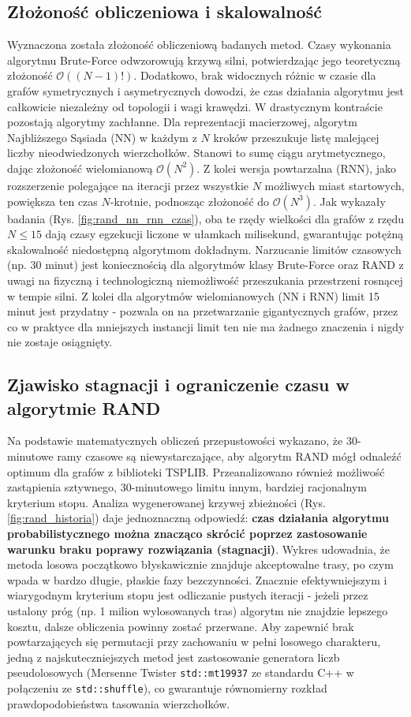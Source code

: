 \documentclass[conference]{IEEEtran}
\begin{document}
        \subsection{Złożoność obliczeniowa i skalowalność}
            Wyznaczona została złożoność obliczeniową badanych metod. Czasy wykonania algorytmu Brute-Force odwzorowują krzywą silni, potwierdzając jego teoretyczną złożoność $\mathcal{O}((N-1)!)$. Dodatkowo, brak widocznych różnic w czasie dla grafów symetrycznych i asymetrycznych dowodzi, że czas działania algorytmu jest całkowicie niezależny od topologii i wagi krawędzi.
            W drastycznym kontraście pozostają algorytmy zachłanne. Dla reprezentacji macierzowej, algorytm Najbliższego Sąsiada (NN) w każdym z $N$ kroków przeszukuje listę malejącej liczby nieodwiedzonych wierzchołków. Stanowi to sumę ciągu arytmetycznego, dając złożoność wielomianową $\mathcal{O}(N^2)$. Z kolei wersja powtarzalna (RNN), jako rozszerzenie polegające na iteracji przez wszystkie $N$ możliwych miast startowych, powiększa ten czas $N$-krotnie, podnosząc złożoność do $\mathcal{O}(N^3)$. Jak wykazały badania (Rys. \ref{fig:rand_nn_rnn_czas}), oba te rzędy wielkości dla grafów z rzędu $N \le 15$ dają czasy egzekucji liczone w ułamkach milisekund, gwarantując potężną skalowalność niedostępną algorytmom dokładnym.
            Narzucanie limitów czasowych (np. 30 minut) jest koniecznością dla algorytmów klasy Brute-Force oraz RAND z uwagi na fizyczną i technologiczną niemożliwość przeszukania przestrzeni rosnącej w tempie silni. Z kolei dla algorytmów wielomianowych (NN i RNN) limit 15 minut jest przydatny - pozwala on na przetwarzanie gigantycznych grafów, przez co w praktyce dla mniejszych instancji limit ten nie ma żadnego znaczenia i nigdy nie zostaje osiągnięty.
        \subsection{Zjawisko stagnacji i ograniczenie czasu w algorytmie RAND}
            Na podstawie matematycznych obliczeń przepustowości wykazano, że 30-minutowe ramy czasowe są niewystarczające, aby algorytm RAND mógł odnaleźć optimum dla grafów z biblioteki TSPLIB.
            Przeanalizowano również możliwość zastąpienia sztywnego, 30-minutowego limitu innym, bardziej racjonalnym kryterium stopu. Analiza wygenerowanej krzywej zbieżności (Rys. \ref{fig:rand_historia}) daje jednoznaczną odpowiedź: \textbf{czas działania algorytmu probabilistycznego można znacząco skrócić poprzez zastosowanie warunku braku poprawy rozwiązania (stagnacji)}.
            Wykres udowadnia, że metoda losowa początkowo błyskawicznie znajduje akceptowalne trasy, po czym wpada w bardzo długie, płaskie fazy bezczynności. Znacznie efektywniejszym i wiarygodnym kryterium stopu jest odliczanie pustych iteracji - jeżeli przez ustalony próg (np. 1 milion wylosowanych tras) algorytm nie znajdzie lepszego kosztu, dalsze obliczenia powinny zostać przerwane.
            Aby zapewnić brak powtarzających się permutacji przy zachowaniu w pełni losowego charakteru, jedną z najskuteczniejszych metod jest zastosowanie generatora liczb pseudolosowych (Mersenne Twister \texttt{std::mt19937} ze standardu C++ w połączeniu ze \texttt{std::shuffle}), co gwarantuje równomierny rozkład prawdopodobieństwa tasowania wierzchołków.
\end{document}
